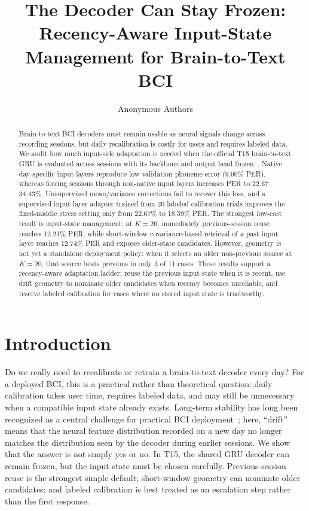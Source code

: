 \documentclass{article}
\title{The Decoder Can Stay Frozen:\\Recency-Aware Input-State Management for Brain-to-Text BCI}
\author{Anonymous Authors}
\begin{document}
\maketitle

\begin{abstract}
Brain-to-text BCI decoders must remain usable as neural signals change across recording sessions, but daily recalibration is costly for users and requires labeled data. We audit how much input-side adaptation is needed when the official T15 brain-to-text GRU is evaluated across sessions with its backbone and output head frozen~\cite{card2024accurate}. Native day-specific input layers reproduce low validation phoneme error (9.06\% PER), whereas forcing sessions through non-native input layers increases PER to 22.67--34.43\%. Unsupervised mean/variance corrections fail to recover this loss, and a supervised input-layer adapter trained from 20 labeled calibration trials improves the fixed-middle stress setting only from 22.67\% to 18.59\% PER. The strongest low-cost result is input-state management: at $K=20$, immediately previous-session reuse reaches 12.21\% PER, while short-window covariance-based retrieval of a past input layer reaches 12.74\% PER and exposes older-state candidates. However, geometry is not yet a standalone deployment policy: when it selects an older non-previous source at $K=20$, that source beats previous in only 3 of 11 cases. These results support a recency-aware adaptation ladder: reuse the previous input state when it is recent, use drift geometry to nominate older candidates when recency becomes unreliable, and reserve labeled calibration for cases where no stored input state is trustworthy.
\end{abstract}

\section{Introduction}
Do we really need to recalibrate or retrain a brain-to-text decoder every day? For a deployed BCI, this is a practical rather than theoretical question: daily calibration takes user time, requires labeled data, and may still be unnecessary when a compatible input state already exists. Long-term stability has long been recognized as a central challenge for practical BCI deployment~\cite{vaadia2009grand}; here, ``drift'' means that the neural feature distribution recorded on a new day no longer matches the distribution seen by the decoder during earlier sessions. We show that the answer is not simply yes or no. In T15, the shared GRU decoder can remain frozen, but the input state must be chosen carefully. Previous-session reuse is the strongest simple default; short-window geometry can nominate older candidates; and labeled calibration is best treated as an escalation step rather than the first response.
\end{document}
